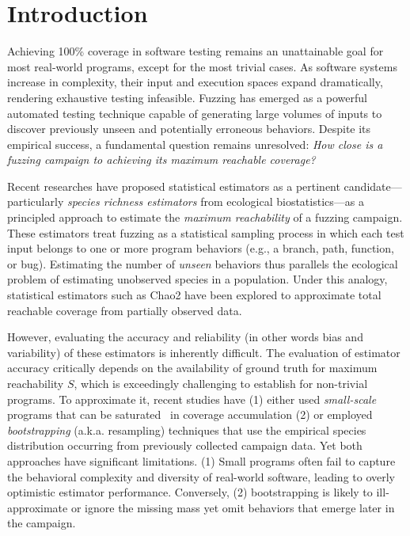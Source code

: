 \section{Introduction}

Achieving 100\% coverage in software testing remains an unattainable goal for most real-world programs, except for the most trivial cases. As software systems increase in complexity, their input and execution spaces expand dramatically, rendering exhaustive testing infeasible. Fuzzing has emerged as a powerful automated testing technique capable of generating large volumes of inputs to discover previously unseen and potentially erroneous behaviors. Despite its empirical success, a fundamental question remains unresolved: \emph{How close is a fuzzing campaign to achieving its maximum reachable coverage?}

Recent researches have proposed statistical estimators as a pertinent candidate—particularly \emph{species richness estimators} from ecological biostatistics—as a principled approach to estimate the \emph{maximum reachability} of a fuzzing campaign. These estimators treat fuzzing as a statistical sampling process in which each test input belongs to one or more program behaviors (e.g., a branch, path, function, or bug). Estimating the number of \emph{unseen} behaviors thus parallels the ecological problem of estimating unobserved species in a population. Under this analogy, statistical estimators such as Chao2 have been explored to approximate total reachable coverage from partially observed data.

However, evaluating the accuracy and reliability (in other words bias and variability) of these estimators is inherently difficult. The evaluation of estimator accuracy critically depends on the availability of ground truth for maximum reachability $S$, which is exceedingly challenging to establish for non-trivial programs. To approximate it, recent studies have (1) either used \emph{small-scale} programs that can be saturated~\cite{reachability_2023} in coverage accumulation (2) or employed \emph{bootstrapping} (a.k.a. resampling) techniques that use the empirical species distribution occurring from previously collected campaign data. Yet both approaches have significant limitations. (1) Small programs often fail to capture the behavioral complexity and diversity of real-world software, leading to overly optimistic estimator performance. Conversely, (2) bootstrapping is likely to ill-approximate or ignore the missing mass yet omit behaviors that emerge later in the campaign.

